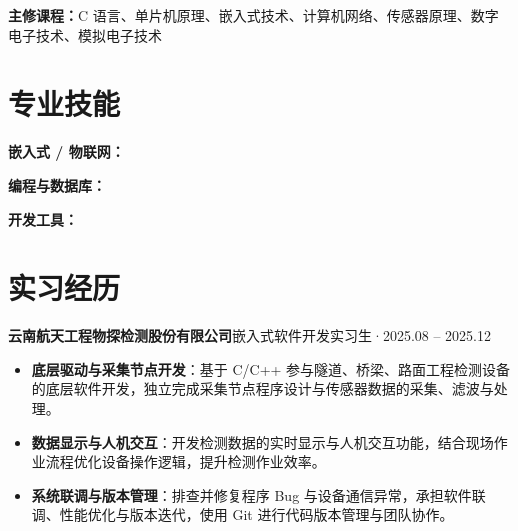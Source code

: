 \documentclass[10pt,a4paper]{article}
\begin{document}
\vspace{0.2em}

{\color{darktext}\textbf{主修课程：}C 语言、单片机原理、嵌入式技术、计算机网络、传感器原理、数字电子技术、模拟电子技术}

\section{\faCogs\hspace{0.4em}专业技能}

{\bfseries\color{primary}嵌入式 / 物联网：}

\vspace{2pt}

{\bfseries\color{primary}编程与数据库：}

\vspace{2pt}

{\bfseries\color{primary}开发工具：}

\section{\faBriefcase\hspace{0.4em}实习经历}

{\bfseries 云南航天工程物探检测股份有限公司}\hfill{\color{graytext}嵌入式软件开发实习生\hspace{0.3em}·\hspace{0.3em}2025.08 -- 2025.12}

\vspace{2pt}

\begin{itemize}[leftmargin=1.5em, itemsep=1pt, parsep=0pt, topsep=2pt]
    \item \textbf{底层驱动与采集节点开发}：基于 C/C++ 参与隧道、桥梁、路面工程检测设备的底层软件开发，独立完成采集节点程序设计与传感器数据的采集、滤波与处理。
    \item \textbf{数据显示与人机交互}：开发检测数据的实时显示与人机交互功能，结合现场作业流程优化设备操作逻辑，提升检测作业效率。
    \item \textbf{系统联调与版本管理}：排查并修复程序 Bug 与设备通信异常，承担软件联调、性能优化与版本迭代，使用 Git 进行代码版本管理与团队协作。
\end{itemize}
\end{document}
